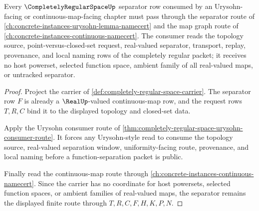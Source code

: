 \begin{theorem}
\label{thm:completely-regular-space-urysohn-continuous-map-route}
Every $\CompletelyRegularSpaceUp$ separator row consumed by an Urysohn-facing or continuous-map-facing chapter must pass through the separator route of \autoref{ch:concrete-instances-urysohn-lemma-namecert} and the map graph route of \autoref{ch:concrete-instances-continuous-namecert}. The consumer reads the topology source, point-versus-closed-set request, real-valued separator, transport, replay, provenance, and local naming rows of the completely regular packet; it receives no host powerset, selected function space, ambient family of all real-valued maps, or untracked separator.
\end{theorem}
\begin{proof}
Project the carrier of \autoref{def:completely-regular-space-carrier}. The separator row $F$ is already a $\RealUp$-valued continuous-map row, and the request rows $T,R,C$ bind it to the displayed topology and closed-set data.

Apply the Urysohn consumer route of \autoref{thm:completely-regular-space-urysohn-consumer-route}. It forces any Urysohn-style read to consume the topology source, real-valued separation window, uniformity-facing route, provenance, and local naming before a function-separation packet is public.

Finally read the continuous-map route through \autoref{ch:concrete-instances-continuous-namecert}. Since the carrier has no coordinate for host powersets, selected function spaces, or ambient families of real-valued maps, the separator remains the displayed finite route through $T,R,C,F,H,K,P,N$.
\end{proof}
